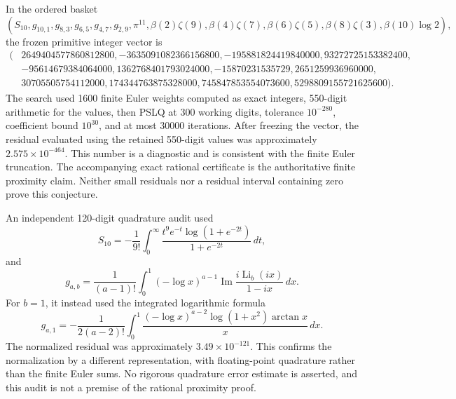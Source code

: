 In the ordered basket
\[
 (S_{10},g_{10,1},g_{8,3},g_{6,5},g_{4,7},g_{2,9},\pi^{11},
 \beta(2)\zeta(9),\beta(4)\zeta(7),\beta(6)\zeta(5),
 \beta(8)\zeta(3),\beta(10)\log2),
\]
the frozen primitive integer vector is
\[
\begin{split}
 (&2649404577860812800,-3635091082366156800,
 -195881824419840000,93272725153382400,\\
 &-95614679384064000,1362768401793024000,-15870231535729,
 2651259936960000,\\
 &30705505754112000,174344763875328000,
 745847853554073600,5298809155721625600).
\end{split}
\]
The search used 1600 finite Euler weights computed as exact integers,
550-digit arithmetic for the values, then PSLQ at 300 working digits,
tolerance $10^{-280}$, coefficient bound $10^{30}$, and at most 30000
iterations.  After freezing the vector, the residual evaluated using the
retained 550-digit values was approximately $2.575\times10^{-464}$.
This number is a diagnostic and is consistent with the finite Euler
truncation.  The accompanying exact rational certificate is the
authoritative finite proximity claim.  Neither small residuals nor a
residual interval containing zero prove this conjecture.

An independent 120-digit quadrature audit used
\[
 S_{10}=-\frac1{9!}\int_0^\infty
 \frac{t^9e^{-t}\log(1+e^{-2t})}{1+e^{-2t}}\,dt,
\]
and
\[
 g_{a,b}=\frac1{(a-1)!}\int_0^1(-\log x)^{a-1}
 \operatorname{Im}\frac{i\operatorname{Li}_b(ix)}{1-ix}\,dx.
\]
For $b=1$, it instead used the integrated logarithmic formula
\[
 g_{a,1}=-\frac1{2(a-2)!}\int_0^1
 \frac{(-\log x)^{a-2}\log(1+x^2)\arctan x}{x}\,dx.
\]
The normalized residual was approximately $3.49\times10^{-121}$.
This confirms the normalization by a different representation, with
floating-point quadrature rather than the finite Euler sums.  No
rigorous quadrature error estimate is asserted, and this audit is not
a premise of the rational proximity proof.

